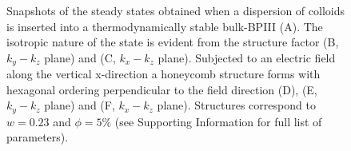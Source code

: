 \documentclass[12pt]{article}
\begin{document}
\begin{figure}
{\begin{minipage}[t]{0.17\textwidth}
\end{minipage}
}
\caption{Snapshots of the steady states obtained when a dispersion of colloids is inserted into a thermodynamically stable bulk-BPIII (A). The isotropic nature of the state is evident from the structure factor (B, $k_y-k_z$ plane) and (C, $k_x-k_z$ plane). Subjected to an electric field along the vertical x-direction a honeycomb structure forms with hexagonal ordering perpendicular to the field direction (D), (E, $k_y-k_z$ plane) and (F, $k_x-k_z$ plane).     
Structures correspond to $w=0.23$ and $\phi=5\%$ (see Supporting Information
for full list of parameters). }
\end{figure}
\end{document}

